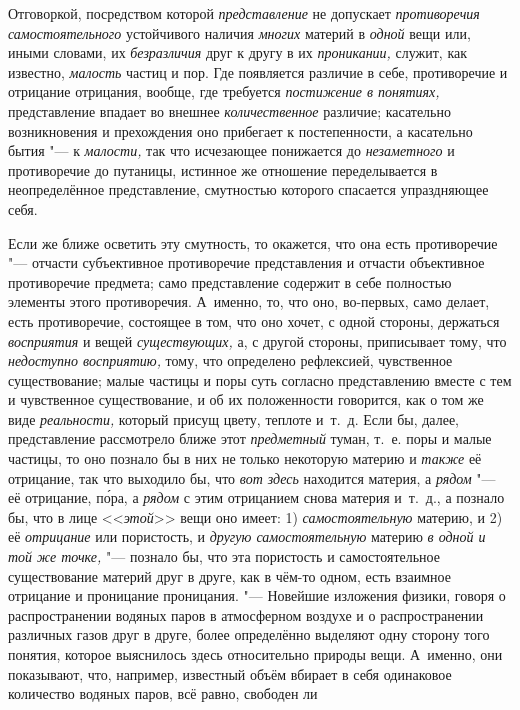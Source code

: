 Отговоркой, посредством которой {\em представление} не
допускает {\em противоречия самостоятельного}
устойчивого наличия {\em многих} материй в
{\em одной} вещи или, иными словами, их
{\em безразличия} друг к другу в их
{\em проникании,} служит, как известно,
{\em малость} частиц и пор. Где появляется различие в
себе, противоречие и отрицание отрицания, вообще, где требуется
{\em постижение в понятиях,} представление впадает во
внешнее {\em количественное} различие; касательно
возникновения и прехождения оно прибегает к постепенности, а касательно
бытия "--- к {\em малости,} так что исчезающее понижается
до {\em незаметного} и противоречие до путаницы,
истинное же отношение переделывается в неопределённое представление,
смутностью которого спасается упраздняющее себя.

Если же ближе осветить эту смутность, то окажется, что она есть противоречие
"--- отчасти субъективное противоречие представления и отчасти объективное
противоречие предмета; само представление содержит в себе полностью
элементы этого противоречия. А~именно, то, что оно, во-первых, само делает,
есть противоречие, состоящее в том, что оно хочет, с одной стороны,
держаться {\em восприятия} и вещей
{\em существующих,} а, с другой стороны, приписывает
тому, что {\em недоступно восприятию,} тому, что
определено рефлексией, чувственное существование; малые частицы и поры суть
согласно представлению вместе с тем и чувственное существование, и об их
положенности говорится, как о том же виде
{\em реальности,} который присущ цвету, теплоте и~т.~д.
Если бы, далее, представление рассмотрело ближе этот
{\em предметный} туман, т.~е. поры и малые частицы, то
оно познало бы в них не только некоторую материю и
{\em также} её отрицание, так что выходило бы, что
{\em вот здесь} находится материя, а
{\em рядом} "--- её отрицание, п\'{о}ра, а
{\em рядом} с этим отрицанием снова материя и~т.~д., а
познало бы, что в лице <<{\em этой}>> вещи оно имеет: 1)
{\em самостоятельную} материю, и 2) её {\em отрицание} или пористость, и
{\em другую самостоятельную} материю
{\em в одной и той же точке,} "--- познало бы, что эта
пористость и самостоятельное существование материй друг в друге, как в
чём-то одном, есть взаимное отрицание и проницание проницания. "--- Новейшие
изложения физики, говоря о распространении водяных паров в атмосферном
воздухе и о распространении различных газов друг в друге, более определённо
выделяют одну сторону того понятия, которое выяснилось здесь относительно
природы вещи. А~именно, они показывают, что, например, известный объём
вбирает в себя одинаковое количество водяных паров, всё равно, свободен ли
